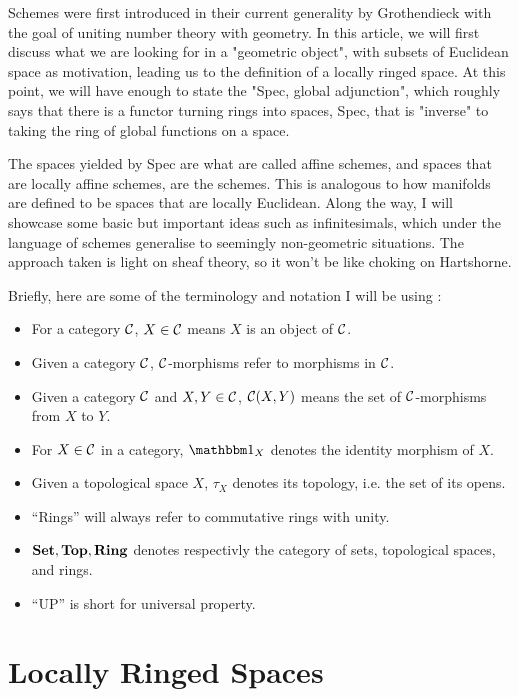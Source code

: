
\tableofcontents

Schemes were first introduced in their current generality by Grothendieck with
the goal of uniting number theory with geometry. In this article, we will first
discuss what we are looking for in a "geometric object", with subsets of
Euclidean space as motivation, leading us to the definition of a locally ringed
space. At this point, we will have enough to state 
the "Spec, global adjunction", 
which roughly says that there is a functor turning rings into
spaces, Spec, that is "inverse" to taking the ring of global functions on a
space.

The spaces yielded by Spec are what are called affine schemes, and
spaces that are locally affine schemes, are the schemes. 
This is analogous to how manifolds are defined to be spaces that are locally
Euclidean. Along the way, I will showcase some basic but important ideas such as
infinitesimals, which under the language of schemes generalise to seemingly
non-geometric situations. The approach taken is light on sheaf theory, so it
won't be like choking on Hartshorne.

Briefly, here are some of the terminology and notation I will be using : 
\begin{itemize}
  \item For a category $\mathcal{C}$, $X \in \mathcal{C}$ means $X$ is an object of $\mathcal{C}$.
  \item Given a category $\mathcal{C}$, $\mathcal{C}$-morphisms refer to morphisms in $\mathcal{C}$.
  \item Given a category $\mathcal{C}$ and $X, Y \in \mathcal{C}$, 
  $\mathcal{C}(X,Y)$ means the set of $\mathcal{C}$-morphisms from $X$ to $Y$.
  \item For $X \in \mathcal{C}$ in a category,
  $\id{X}$ denotes the identity morphism of $X$.
  \item Given a topological space $X$, $\tau_X$ denotes its topology,
  i.e. the set of its opens.
  \item ``Rings'' will always refer to commutative rings with unity. 
  \item $\mathbf{Set}, \mathbf{Top}, \mathbf{Ring}$ denotes respectivly the category of 
  sets, topological spaces, and rings.
  \item ``UP'' is short for universal property. 
\end{itemize}

\section{Locally Ringed Spaces}

